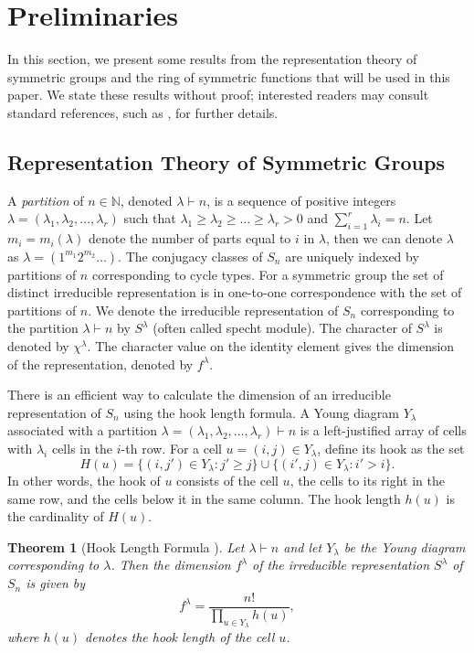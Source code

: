 \documentclass[12pt]{article}
\newtheorem{theorem}{Theorem}
\theoremstyle{definition}
\newcommand{\1}{\mathbf 1}
\begin{document}
\section{Preliminaries} 
\label{sec:preliminaries}
 In this section, we present some results from the representation theory of symmetric groups and the ring of symmetric functions that will be used in this paper. We state these results without proof; interested readers may consult standard references, such as \cite{macdonald1998symmetric,sagan2001symmetric,Stanley_2023}, for further details.

\subsection{Representation Theory of Symmetric Groups}

A \emph{partition} of $n \in \mathbb{N}$, denoted $\lambda \vdash n$, is a sequence of positive integers $\lambda = (\lambda_1, \lambda_2, \dots, \lambda_r)$ such that $\lambda_1 \ge \lambda_2 \ge \dots \ge \lambda_r > 0$ and $\sum_{i=1}^r \lambda_i = n$. Let $m_i=m_i(\lambda)$ denote the number of parts equal to $i$ in $\lambda$, then we can denote $\lambda$ as $\lambda=(1^{m_1}2^{m_2}\ldots)$. The conjugacy classes of $S_n$ are uniquely indexed by partitions of $n$ corresponding to cycle types. For a symmetric group the set of distinct irreducible representation is in one-to-one correspondence with the set of partitions of $n$. We denote the irreducible representation of $S_n$ corresponding to the  partition $\lambda \vdash n$ by $S^{\lambda}$ (often called specht module). The character of $S^{\lambda}$ is denoted by $\chi^{\lambda}$. The character value on the identity element gives the dimension of the representation, denoted by $f^{\lambda}$. 

There is an efficient way to calculate the dimension of an irreducible representation of $S_n$ using the hook length formula. A Young diagram $Y_\lambda$ associated with a partition
$\lambda=(\lambda_1,\lambda_2,\ldots,\lambda_r)\vdash n$ is a left-justified array of cells with $\lambda_i$ cells in the $i$-th row. For a cell $u=(i,j)\in Y_\lambda$, define its hook as the set
$$H(u)=\{(i,j')\in Y_\lambda:j'\geq j\}
\cup
\{(i',j)\in Y_\lambda:i'>i\}.$$
In other words, the hook of $u$ consists of the cell $u$, the cells to its right in the same row, and the cells below it in the same column. The hook length $h(u)$ is the cardinality of $H(u)$.

\begin{theorem}[Hook Length Formula \cite{frame1954hook}]
Let $\lambda\vdash n$ and let $Y_\lambda$ be the Young diagram corresponding to $\lambda$. Then the dimension $f^\lambda$ of the irreducible representation $S^{\lambda}$ of $S_n$ is given by
$$f^\lambda
=
\frac{n!}{\displaystyle\prod_{u\in Y_\lambda} h(u)},$$
where $h(u)$ denotes the hook length of the cell $u$.
\end{theorem}
\end{document}
